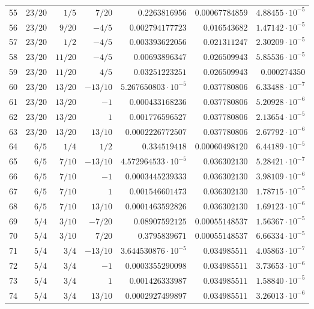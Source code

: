 \documentclass[11pt,reqno]{amsart}
\numberwithin{equation}{section}
\theoremstyle{definition}
\theoremstyle{remark}
\begin{document}
\begin{center}
\begin{longtable}{@{}rrrrrrr@{}}
55 & $23/20$ & $1/5$ & $7/20$ & $0.2263816956$ & $0.00067784859$ & $4.88455\cdot10^{-5}$\\
56 & $23/20$ & $9/20$ & $-4/5$ & $0.002794177723$ & $0.016543682$ & $1.47142\cdot10^{-5}$\\
57 & $23/20$ & $1/2$ & $-4/5$ & $0.003393622056$ & $0.021311247$ & $2.30209\cdot10^{-5}$\\
58 & $23/20$ & $11/20$ & $-4/5$ & $0.00693896347$ & $0.026509943$ & $5.85536\cdot10^{-5}$\\
59 & $23/20$ & $11/20$ & $4/5$ & $0.03251223251$ & $0.026509943$ & $0.000274350$\\
60 & $23/20$ & $13/20$ & $-13/10$ & $5.267650803\cdot10^{-5}$ & $0.037780806$ & $6.33488\cdot10^{-7}$\\
61 & $23/20$ & $13/20$ & $-1$ & $0.000433168236$ & $0.037780806$ & $5.20928\cdot10^{-6}$\\
62 & $23/20$ & $13/20$ & $1$ & $0.001776596527$ & $0.037780806$ & $2.13654\cdot10^{-5}$\\
63 & $23/20$ & $13/20$ & $13/10$ & $0.0002226772507$ & $0.037780806$ & $2.67792\cdot10^{-6}$\\
64 & $6/5$ & $1/4$ & $1/2$ & $0.334519418$ & $0.00060498120$ & $6.44189\cdot10^{-5}$\\
65 & $6/5$ & $7/10$ & $-13/10$ & $4.572964533\cdot10^{-5}$ & $0.036302130$ & $5.28421\cdot10^{-7}$\\
66 & $6/5$ & $7/10$ & $-1$ & $0.0003445239333$ & $0.036302130$ & $3.98109\cdot10^{-6}$\\
67 & $6/5$ & $7/10$ & $1$ & $0.001546601473$ & $0.036302130$ & $1.78715\cdot10^{-5}$\\
68 & $6/5$ & $7/10$ & $13/10$ & $0.0001463592826$ & $0.036302130$ & $1.69123\cdot10^{-6}$\\
69 & $5/4$ & $3/10$ & $-7/20$ & $0.08907592125$ & $0.00055148537$ & $1.56367\cdot10^{-5}$\\
70 & $5/4$ & $3/10$ & $7/20$ & $0.3795839671$ & $0.00055148537$ & $6.66334\cdot10^{-5}$\\
71 & $5/4$ & $3/4$ & $-13/10$ & $3.644530876\cdot10^{-5}$ & $0.034985511$ & $4.05863\cdot10^{-7}$\\
72 & $5/4$ & $3/4$ & $-1$ & $0.0003355290098$ & $0.034985511$ & $3.73653\cdot10^{-6}$\\
73 & $5/4$ & $3/4$ & $1$ & $0.001426333987$ & $0.034985511$ & $1.58840\cdot10^{-5}$\\
74 & $5/4$ & $3/4$ & $13/10$ & $0.0002927499897$ & $0.034985511$ & $3.26013\cdot10^{-6}$\\

\end{longtable}
\end{center}
\end{document}
